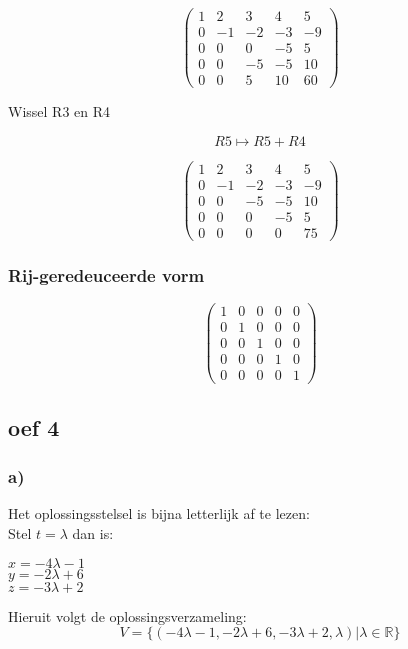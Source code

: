 \documentclass[lineaire_algebra_oplossingen.tex]{subfiles}
\begin{document}
\[
\begin{pmatrix}
1 &  2 &  3 &  4 &  5\\
0 & -1 & -2 & -3 & -9\\
0 &  0 &  0 & -5 &  5\\
0 &  0 & -5 & -5 & 10\\
0 &  0 &  5 & 10 & 60 
\end{pmatrix}
\]
\begin{center}
Wissel R3 en R4
\end{center}
\[ R5 \longmapsto R5 + R4\]

\[
\begin{pmatrix}
1 &  2 &  3 &  4 &  5\\
0 & -1 & -2 & -3 & -9\\
0 &  0 & -5 & -5 & 10\\
0 &  0 &  0 & -5 &  5\\
0 &  0 &  0 &  0 & 75 
\end{pmatrix}
\]

\subsubsection*{Rij-geredeuceerde vorm}
\[
\begin{pmatrix}
1 &  0 &  0 &  0 & 0\\
0 &  1 &  0 &  0 & 0\\
0 &  0 &  1 &  0 & 0\\
0 &  0 &  0 &  1 & 0\\
0 &  0 &  0 &  0 & 1 
\end{pmatrix}
\]

\subsection{oef 4}
\subsubsection*{a)}
Het oplossingsstelsel is bijna letterlijk af te lezen:\\
Stel $t=\lambda$ dan is:\\
\begin{center}
$x = -4\lambda - 1$\\
$y = -2\lambda + 6$\\
$z = -3\lambda + 2$\\
\end{center}
Hieruit volgt de oplossingsverzameling:
\[
V=\{(-4\lambda - 1,-2\lambda + 6,-3\lambda + 2, \lambda)|\lambda \in \mathbb{R}\}
\]
\end{document}
